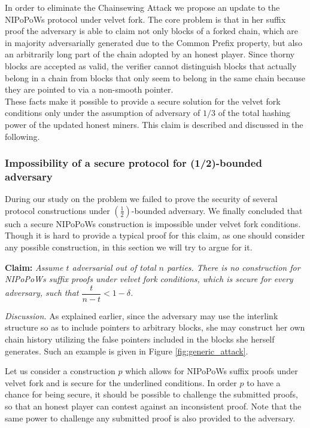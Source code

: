 In order to eliminate the Chainsewing Attack we propose an update to the NIPoPoWs
protocol under velvet fork. The core problem is that in her suffix proof the adversary
is able to claim not only blocks of a forked chain,  which are in majority adversarially
generated due to the Common Prefix property, but also an arbitrarily long part of the
chain adopted by an honest player. Since thorny blocks are accepted as valid,
the verifier cannot distinguish blocks that actually belong in a chain from
blocks that only seem to belong in the same chain because they are pointed to
via a non-smooth pointer. \\

These facts make it possible to provide a secure solution for the velvet fork
conditions only under the assumption of adversary of $1/3$ of the total hashing
power of the updated honest miners. This claim is described and discussed in
the following.

\subsubsection*{Impossibility of a secure protocol for (1/2)-bounded adversary}
During our study on the problem we failed to prove the security of several protocol
constructions under $(\frac{1}{2})$-bounded adversary. We finally concluded that
such a secure NIPoPoWs construction is impossible under velvet fork conditions.
Though it is hard to provide a typical proof for this claim, as one should consider
any possible construction, in this section we will try to argue for it.

\textbf{Claim:} \textit{Assume $t$ adversarial out of total $n$ parties. There is
no construction for NIPoPoWs suffix proofs under velvet fork conditions, which is
secure for every adversary, such that $\dfrac{t}{n-t} < 1 - \delta$.}

\textit{Discussion.} As explained earlier, since the adversary may use the interlink
structure so as to include pointers to arbitrary blocks,  she may construct her own
chain history utilizing the false pointers included in the blocks she herself generates.
Such an example is given in Figure \ref{fig:generic_attack}.

Let us consider a construction $p$ which allows for NIPoPoWs suffix proofs under velvet
fork and is secure for the underlined conditions. In order $p$ to have a chance for
being secure, it should be possible to challenge the submitted proofs, so that an
honest player can contest against an inconsistent proof. Note that the same power
to challenge any submitted proof is also provided to the adversary.

